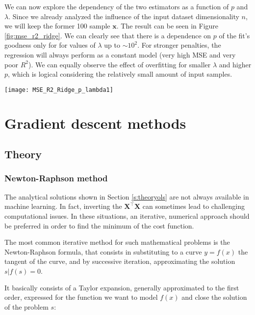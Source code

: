 \documentclass[11pt,a4paper,twocolumn]{article}
\begin{document}
We can now explore the dependency of the two estimators as a function of $p$ and $\lambda$. Since we already analyzed the influence of the input dataset dimensionality $n$, we will keep the former 100 sample $\boldsymbol{x}$. The result can be seen in Figure \ref{fig:mse_r2_ridge}. We can clearly see that there is a dependence on $p$ of the fit's goodness only for for values of $\lambda$ up to $\sim 10^2$. For stronger penalties, the regression will always perform as a constant model (very high MSE and very poor $R^2$). We can equally observe the effect of overfitting for smaller $\lambda$ and higher $p$, which is logical considering the relatively small amount of input samples.

\begin{figure*}
	\centering
	\texttt{[image: MSE\_R2\_Ridge\_p\_lambda1]}
	\caption{\textbf{Ridge regression} | For different values of $\lambda$ (penalty coefficient), from a former dataset of $n = 100$ observations. When $\lambda$ approaches 0, the fit approximates to a simple OLS regression. Runge function with noise is also shown in blue.}
	\label{fig:mse_r2_ridge}
\end{figure*}


\section{Gradient descent methods}

\subsection{Theory}

\subsubsection{Newton-Raphson method}
The analytical solutions shown in Section \ref{s:theoryols} are not always available in machine learning. In fact, inverting the $\boldsymbol{X^\intercal X}$ can sometimes lead to challenging computational issues. In these situations, an iterative, numerical approach should be preferred in order to find the minimum of the cost function.

The most common iterative method for such mathematical problems is the Newton-Raphson formula, that consists in substituting to a curve $y = f(x)$ the tangent of the curve, and by successive iteration, approximating the solution $s | f(s) = 0$.

It basically consists of a Taylor expansion, generally approximated to the first order, expressed for the function we want to model $f(x)$ and close the solution of the problem $s$:
\end{document}
